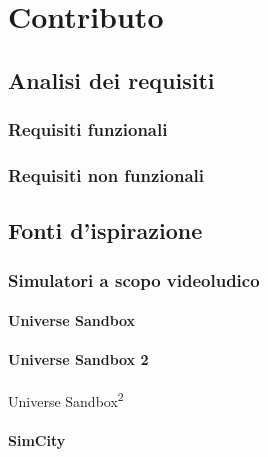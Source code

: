 

\chapter{Contributo}\label{ch:contributo}
\section{Analisi dei requisiti}\label{sec:analisi}
\subsection{Requisiti funzionali}\label{sub:funzionali}
\subsection{Requisiti non funzionali}\label{sub:nonFunzionali}
\section{Fonti d'ispirazione}\label{sec:ispirazione}
\subsection{Simulatori a scopo videoludico}\label{sub:videogame}
\subsubsection{Universe Sandbox}\label{subsub:us1}
\subsubsection{Universe Sandbox 2}{Universe Sandbox\textsuperscript{2}}\label{subsub:us2}
\subsubsection{SimCity}\label{subsub:simcity}
